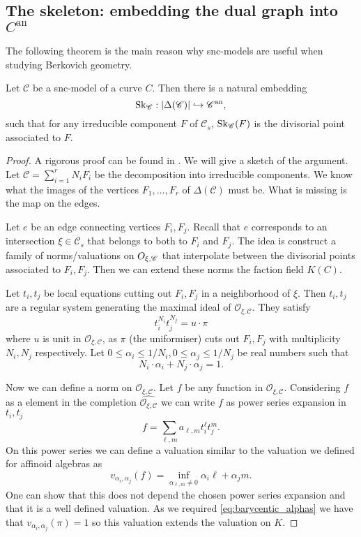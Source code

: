 \subsection{The skeleton: embedding the dual graph into $C^{\mathrm{an}}$}\label{sec:skeleton}
The following theorem is the main reason why snc-models are useful when studying Berkovich geometry. 
\begin{theorem}
	Let $\mathscr C$ be a snc-model of a curve $C$. 
	Then there is a natural embedding \[
		\operatorname{Sk}_{\mathscr C}:|\Delta(\mathscr C)| \hookrightarrow \mathscr C{}^{\text{an}}
	,\]
	such that for any irreducible component $F$ of $\mathscr C_s$,  $\operatorname{Sk}_{\mathscr C}(F)$ is the divisorial point associated to $F$. 
\end{theorem}
\begin{proof}
	A rigorous proof can be found in \cite[3.1.4]{mustataWeightFunctionsNonArchimedean2015}.
	We will give a sketch of the argument. 
	Let $\mathscr C = \sum_{i= 1}^{r} N_i F_i$ be the decomposition into irreducible components. 
	We know what the images of the vertices $F_1, \ldots, F_r$ of $\Delta(\mathscr C)$ must be.
	What is missing is the map on the edges. 

	Let $e$ be an edge connecting vertices $F_i, F_j$. 
	Recall that $e$ corresponds to an intersection $\xi \in \mathscr C_s$ that belongs to both to $F_i$ and $F_j$. 
	The idea is construct a family of norms/valuations on $\mathscr \mathcal{O}_{\xi, \mathscr C}$ that interpolate between the divisorial points associated to $F_i, F_j$. Then we can extend these norms the faction field $K(C)$. 

	Let $t_i, t_j$ be local equations cutting out $F_i, F_j$ in a neighborhood of  $\xi$. 
	Then $t_i, t_j$ are a regular system generating the maximal ideal of $\mathcal{O}_{\xi, \mathscr C}. $ 
	They satisfy \[
		t_i ^{N_i} t _j^{N_j} = u\cdot \pi
	\] 
	where $u$ is unit in $\mathcal{O}_{\xi, \mathscr C}$, as $\pi$ (the uniformiser) cuts out $F_i, F_j$ with multiplicity $N_i, N_j$ respectively.  
	Let $0 \le \alpha_i \le 1 / N_i,   0 \le \alpha_j \le 1 / N_j$ be real numbers such that \begin{equation}\label{eq:barycentic_alphas}
		N_i\cdot \alpha_i + N_j \cdot \alpha_j = 1
	.\end{equation}
	
	Now we can define a norm on $\mathcal{O}_{\xi, \mathscr C}$. 
	Let  $f$ be any function in $\mathcal{O}_{\xi, \mathscr C}$. 
	Considering $f$ as a element in the completion $\hat{\mathcal{O}_{\xi, \mathscr C}}$ we can write $f$ as power series expansion in $t_i, t_j$  \[
		f = \sum_{\ell, m}^{} a_{\ell, m} t_i ^{\ell} t_j^{m}
	.\] 
	On this power series we can define a valuation similar to the valuation we defined  for affinoid algebras as \[
		v_{\alpha_i, \alpha_j}(f) = \inf_{\alpha_{\ell, m} \ne 0}{\alpha_i \ell + \alpha_j m}
	.\] 
	One can show that this does not depend the chosen power series expansion and that it is a well defined valuation. 
	As we required \eqref{eq:barycentic_alphas} we have that  $v_{\alpha_i, \alpha_j}(\pi) = 1$ so this valuation extends the valuation on $K$. 
\end{proof}
